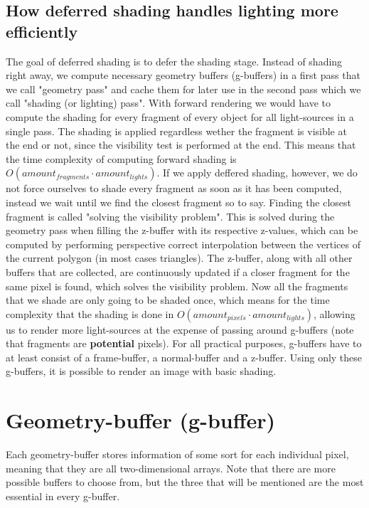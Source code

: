 \documentclass{ACGSeminar}
\begin{document}
	\subsection{How deferred shading handles lighting more efficiently}
		The goal of deferred shading is to defer the shading stage. 
		Instead of shading right away, we compute necessary geometry buffers (g-buffers) in a first pass that we call "geometry pass" and cache 
		them for later use in the second pass which we call "shading (or lighting) pass". With forward rendering we would have to compute the shading for every fragment of every object for all light-sources in a single pass. The shading is applied regardless wether the fragment is visible at the end or not, since the visibility test is performed at the end. This means that the time complexity of computing forward shading is $O(amount_{fragments} \cdot amount_{lights})$. If we apply deffered shading, however, we do not force ourselves to shade every fragment as soon as it has been computed, instead we wait until we find the closest fragment so to say. Finding the closest fragment is called "solving the visibility problem". This is solved during the geometry pass when filling the z-buffer with its respective z-values, which can be computed by performing perspective correct interpolation between the vertices of the current polygon (in most cases triangles). The z-buffer, along with all other buffers that are collected, are continuously updated if a closer fragment for the same pixel is found, which solves the visibility problem. Now all the fragments that we shade are only going to be shaded once, which means for the time complexity that the shading is done in $O(amount_{pixels} \cdot amount_{lights})$, allowing us to render more light-sources at the expense of passing around g-buffers (note that fragments are \textbf{potential} pixels). For all practical purposes, g-buffers have to at least consist of a frame-buffer, a normal-buffer and a z-buffer. Using only these g-buffers, it is possible to render an image with basic shading.

\section{Geometry-buffer (g-buffer)}
	Each geometry-buffer stores information of some sort for each individual pixel, meaning that they are all two-dimensional arrays. Note that there are more possible buffers to choose from, but the three that will be mentioned are the most essential in every g-buffer.
\end{document}
